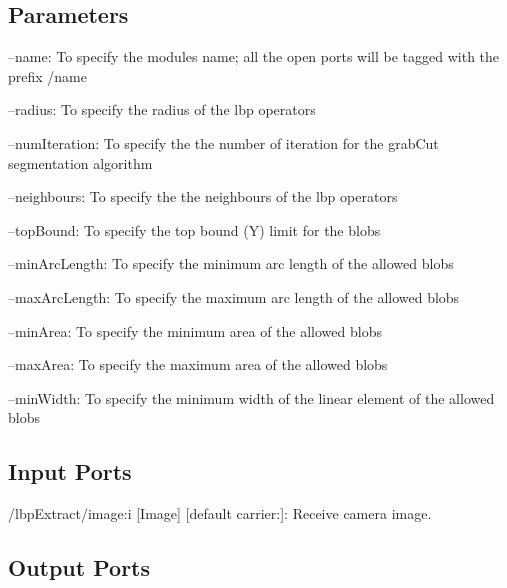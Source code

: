  \hypertarget{group__seg2cloud_parameters_sec}{}\subsection{Parameters}\label{group__seg2cloud_parameters_sec}

\begin{DoxyItemize}
\item --name\+: To specify the module\textquotesingle{}s name; all the open ports will be tagged with the prefix /name
\item --radius\+: To specify the radius of the lbp operators
\item --num\+Iteration\+: To specify the the number of iteration for the grab\+Cut segmentation algorithm
\item --neighbours\+: To specify the the neighbours of the lbp operators
\item --top\+Bound\+: To specify the top bound (Y) limit for the blobs
\item --min\+Arc\+Length\+: To specify the minimum arc length of the allowed blobs
\item --max\+Arc\+Length\+: To specify the maximum arc length of the allowed blobs
\item --min\+Area\+: To specify the minimum area of the allowed blobs
\item --max\+Area\+: To specify the maximum area of the allowed blobs
\item --min\+Width\+: To specify the minimum width of the linear element of the allowed blobs 
\end{DoxyItemize}\hypertarget{group__seg2cloud_inputports_sec}{}\subsection{Input Ports}\label{group__seg2cloud_inputports_sec}

\begin{DoxyItemize}
\item /lbp\+Extract/image\+:i \mbox{[}Image\mbox{]} \mbox{[}default carrier\+:\mbox{]}\+: Receive camera image.
\end{DoxyItemize}\hypertarget{group__seg2cloud_outputports_sec}{}\subsection{Output Ports}\label{group__seg2cloud_outputports_sec}

